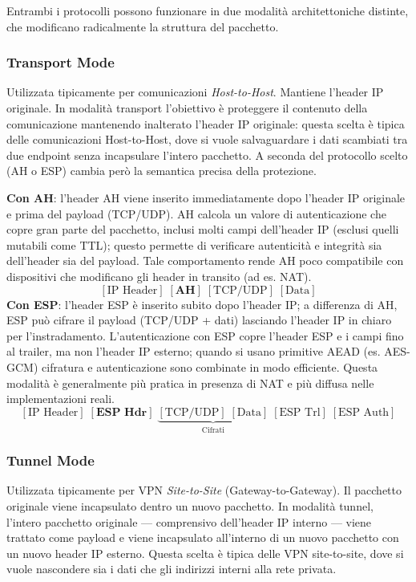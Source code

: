 \documentclass[a4paper, 11pt]{article}
\begin{document}
Entrambi i protocolli possono funzionare in due modalità architettoniche distinte, che modificano radicalmente la struttura del pacchetto.

\subsubsection{Transport Mode}
Utilizzata tipicamente per comunicazioni \textit{Host-to-Host}. Mantiene l'header IP originale.
In modalità transport l'obiettivo è proteggere il contenuto della comunicazione mantenendo inalterato l'header IP originale: questa scelta è tipica delle comunicazioni Host-to-Host, dove si vuole salvaguardare i dati scambiati tra due endpoint senza incapsulare l'intero pacchetto. A seconda del protocollo scelto (AH o ESP) cambia però la semantica precisa della protezione.

\textbf{Con AH}: l'header AH viene inserito immediatamente dopo l'header IP originale e prima del payload (TCP/UDP). AH calcola un valore di autenticazione che copre gran parte del pacchetto, inclusi molti campi dell'header IP (esclusi quelli mutabili come TTL); questo permette di verificare autenticità e integrità sia dell'header sia del payload. Tale comportamento rende AH poco compatibile con dispositivi che modificano gli header in transito (ad es. NAT). 
\[
    [\text{IP Header}] \; [\textbf{AH}] \; [\text{TCP/UDP}] \; [\text{Data}]
\]
\textbf{Con ESP}: l'header ESP è inserito subito dopo l'header IP; a differenza di AH, ESP può cifrare il payload (TCP/UDP + dati) lasciando l'header IP in chiaro per l'instradamento. L'autenticazione con ESP copre l'header ESP e i campi fino al trailer, ma non l'header IP esterno; quando si usano primitive AEAD (es. AES-GCM) cifratura e autenticazione sono combinate in modo efficiente. Questa modalità è generalmente più pratica in presenza di NAT e più diffusa nelle implementazioni reali.
\[
    [\text{IP Header}] \; [\textbf{ESP Hdr}] \; \underbrace{[\text{TCP/UDP}] \; [\text{Data}]}_{\text{Cifrati}} \; [\text{ESP Trl}] \; [\text{ESP Auth}]
\]

\subsubsection{Tunnel Mode}
Utilizzata tipicamente per VPN \textit{Site-to-Site} (Gateway-to-Gateway). Il pacchetto originale viene incapsulato dentro un nuovo pacchetto.
In modalità tunnel, l'intero pacchetto originale — comprensivo dell'header IP interno — viene trattato come payload e viene incapsulato all'interno di un nuovo pacchetto con un nuovo header IP esterno. Questa scelta è tipica delle VPN site-to-site, dove si vuole nascondere sia i dati che gli indirizzi interni alla rete privata.
\end{document}
